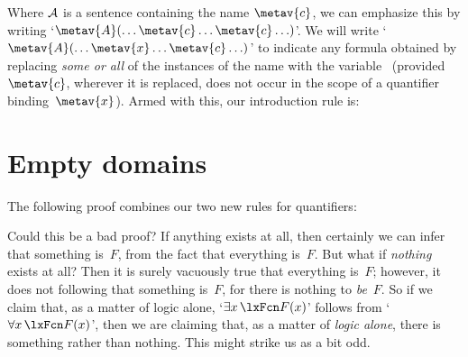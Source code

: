Where $\mathcal{A}$ is a sentence containing the name $\metav{c}$, we
can emphasize this by writing `$\metav{A}(\ldots \metav{c} \ldots
\metav{c}\ldots)$'. We will write `$\metav{A}(\ldots \metav{x} \ldots
\metav{c}\ldots)$' to indicate any formula obtained by replacing
\emph{some or all} of the instances of the name  with the
variable~ (provided~$\metav{c}$, wherever it is
replaced, does not occur in the scope of a quantifier
binding~$\metav{x}$). Armed with this, our introduction rule is:

\section{Empty domains}
The following proof combines our two new rules for quantifiers:
	\begin{fitchproof}
		\PR
	\end{fitchproof}
Could this be a bad proof? If anything exists at all, then certainly we can infer that something is~$F$, from the fact that everything is~$F$. But what if \emph{nothing} exists at all? Then it is surely vacuously true that everything is~$F$; however, it does not following that something is~$F$, for there is nothing to \emph{be}~$F$. So if we claim that, as a matter of logic alone, `$\exists x\,\atom{F}{x}$' follows from `$\forall x\,\atom{F}{x}$', then we are claiming that, as a matter of \emph{logic alone}, there is something rather than nothing. This might strike us as a bit odd.

